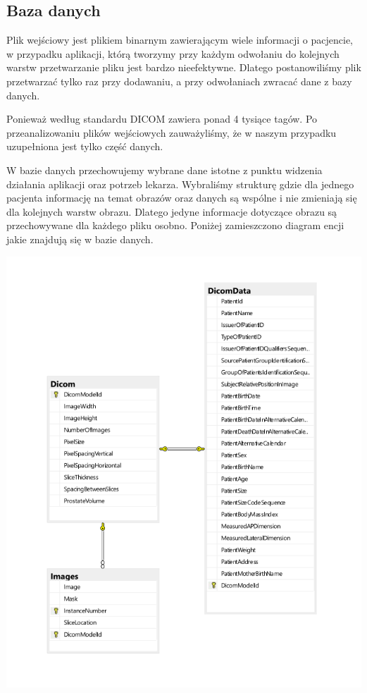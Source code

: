 \documentclass[a4paper,11pt,twoside]{report}
\theoremstyle{definition}
\begin{document}
\subsection{Baza danych}

Plik wejściowy jest plikiem binarnym zawierającym wiele informacji o pacjencie, w przypadku aplikacji, którą tworzymy przy każdym odwołaniu do kolejnych warstw przetwarzanie pliku jest bardzo nieefektywne. Dlatego postanowiliśmy plik przetwarzać tylko raz przy dodawaniu, a przy odwołaniach zwracać dane z bazy danych.
\par
Ponieważ według standardu DICOM \cite{standardDICOM} zawiera ponad 4 tysiące tagów. Po przeanalizowaniu plików wejściowych zauważyliśmy, że w naszym przypadku uzupełniona jest tylko część danych. 
\par
W bazie danych przechowujemy wybrane dane istotne z punktu widzenia działania aplikacji oraz potrzeb lekarza. Wybraliśmy strukturę gdzie dla jednego pacjenta informację na temat obrazów oraz danych są wspólne i nie zmieniają się dla kolejnych warstw obrazu. Dlatego jedyne informacje dotyczące obrazu są przechowywane dla każdego pliku osobno. Poniżej zamieszczono diagram encji jakie znajdują się w bazie danych.

\begin{minipage}{\linewidth}
	\centering
	\includegraphics[width=\textwidth]{Backend/SchematBazy.png}
\end{minipage}
\end{document}

